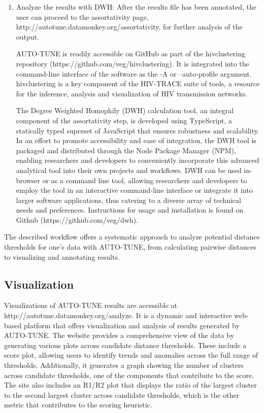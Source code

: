 \documentclass[utf8]{FrontiersinHarvard} %
\begin{document}
\begin{enumerate}
\item{ Analyze the results with DWH: After the results file has been annotated, the user can proceed to the assortativity page, http://autotune.datamonkey.org/assortativity, for further analysis of the output. }

AUTO-TUNE is readily accessible on GitHub as part of the hivclustering repository (https://github.com/veg/hivclustering). It is integrated into the command-line interface of the software as the -A or --auto-profile argument. hivclustering is a key component of the HIV-TRACE suite of tools, a resource for the inference, analysis and visualization of HIV transmission networks. 

The Degree Weighted Homophily (DWH) calculation tool, an integral component of the assortativity step, is developed using TypeScript, a statically typed superset of JavaScript that ensures robustness and scalability. In an effort to promote accessibility and ease of integration, the DWH tool is packaged and distributed through the Node Package Manager (NPM), enabling researchers and developers to conveniently incorporate this advanced analytical tool into their own projects and workflows. DWH can be used in-browser or as a command line tool, allowing researchers and developers to employ the tool in an interactive command-line interface or integrate it into larger software applications, thus catering to a diverse array of technical needs and preferences. Instructions for usage and installation is found on Github (https://github.com/veg/dwh).

\end{enumerate}

The described workflow offers a systematic approach to analyze potential distance thresholds for one's data with AUTO-TUNE, from calculating pairwise distances to visualizing and annotating results.

\subsection{Visualization}

Visualizations of AUTO-TUNE results are accessible at http://autotune.datamonkey.org/analyze. It is a dynamic and interactive web-based platform that offers visualization and analysis of results generated by AUTO-TUNE. 
The website provides a comprehensive view of the data by generating various plots across candidate distance thresholds. These include a score plot, allowing users to identify trends and anomalies across the full range of thresholds. Additionally, it generates a graph showing the number of clusters across candidate thresholds, one of the components that contribute to the score. The site also includes an R1/R2 plot that displays the ratio of the largest cluster to the second largest cluster across candidate thresholds, which is the other metric that contributes to the scoring heuristic. 
\end{document}
